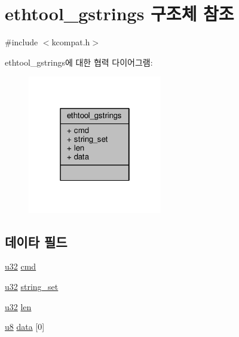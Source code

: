 \hypertarget{structethtool__gstrings}{}\section{ethtool\+\_\+gstrings 구조체 참조}
\label{structethtool__gstrings}


{\ttfamily \#include $<$kcompat.\+h$>$}



ethtool\+\_\+gstrings에 대한 협력 다이어그램\+:
\nopagebreak
\begin{figure}[H]
\begin{center}
\leavevmode
\includegraphics[width=166pt]{structethtool__gstrings__coll__graph}
\end{center}
\end{figure}
\subsection*{데이타 필드}
\begin{DoxyCompactItemize}
\item 
\hyperlink{lib_2igb_2e1000__osdep_8h_a64e91c10a0d8fb627e92932050284264}{u32} \hyperlink{structethtool__gstrings_a62fe2a1dbf17d5a8561a5a7f5a97a9ba}{cmd}
\item 
\hyperlink{lib_2igb_2e1000__osdep_8h_a64e91c10a0d8fb627e92932050284264}{u32} \hyperlink{structethtool__gstrings_a3874391cf16ebd5fe55ee6de9871d873}{string\+\_\+set}
\item 
\hyperlink{lib_2igb_2e1000__osdep_8h_a64e91c10a0d8fb627e92932050284264}{u32} \hyperlink{structethtool__gstrings_a4105737bcbe35c1fd69996a085d8231a}{len}
\item 
\hyperlink{lib_2igb_2e1000__osdep_8h_a8baca7e76da9e0e11ce3a275dd19130c}{u8} \hyperlink{structethtool__gstrings_a2873fa0c210cc63894b6cbb14e1a1330}{data} \mbox{[}0\mbox{]}
\end{DoxyCompactItemize}


